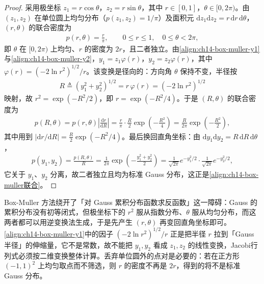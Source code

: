 \documentclass[../../main.tex]{subfiles}
\begin{document}
\begin{proof}
采用极坐标 $z_{1}=r\cos\theta$，$z_{2}=r\sin\theta$，其中 $r\in[0,1]$，$\theta\in[0,2\pi)$。由 $(z_{1},z_{2})$ 在单位圆上均匀分布（$p(z_{1},z_{2})=1/\pi$）及面积元 $\mathrm{d}z_{1}\mathrm{d}z_{2}=r\,\mathrm{d}r\,\mathrm{d}\theta$，$(r,\theta)$ 的联合密度为
\begin{align*}
p(r,\theta)=\frac{r}{\pi},\qquad 0\leqslant r\leqslant 1,\quad 0\leqslant\theta<2\pi,
\end{align*}
即 $\theta$ 在 $[0,2\pi)$ 上均匀、$r$ 的密度为 $2r$，且二者独立。由\eqref{align:ch14-box-muller-y1}与\eqref{align:ch14-box-muller-y2}，$y_{1}=z_{1}\varphi(r)$，$y_{2}=z_{2}\varphi(r)$，其中 $\varphi(r)=\left(-2\ln r^{2}\right)^{1/2}/r$。该变换是径向的：方向角 $\theta$ 保持不变，半径按
\begin{align*}
R\triangleq\left(y_{1}^{2}+y_{2}^{2}\right)^{1/2}=r\,\varphi(r)=\left(-2\ln r^{2}\right)^{1/2}
\end{align*}
映射，故 $r^{2}=\exp\left(-R^{2}/2\right)$，即 $r=\exp\left(-R^{2}/4\right)$。于是 $(R,\theta)$ 的联合密度为
\begin{align*}
p(R,\theta)=p(r,\theta)\left|\frac{\mathrm{d}r}{\mathrm{d}R}\right|=\frac{r}{\pi}\cdot\frac{R}{2}\exp\left(-\frac{R^{2}}{4}\right)=\frac{R}{2\pi}\exp\left(-\frac{R^{2}}{2}\right),
\end{align*}
其中用到 $\left|\mathrm{d}r/\mathrm{d}R\right|=\frac{R}{2}\exp\left(-R^{2}/4\right)$。最后换回直角坐标：由 $\mathrm{d}y_{1}\mathrm{d}y_{2}=R\,\mathrm{d}R\,\mathrm{d}\theta$，
\begin{align*}
p(y_{1},y_{2})=\frac{p(R,\theta)}{R}=\frac{1}{2\pi}\exp\left(-\frac{y_{1}^{2}+y_{2}^{2}}{2}\right)=\frac{1}{\sqrt{2\pi}}e^{-y_{1}^{2}/2}\cdot\frac{1}{\sqrt{2\pi}}e^{-y_{2}^{2}/2},
\end{align*}
它关于 $y_{1}$、$y_{2}$ 分离，故二者独立且均为标准 Gauss 分布，这正是\eqref{align:ch14-box-muller联合}。
\end{proof}

\begin{remark}Box-Muller 方法绕开了「对 Gauss 累积分布函数求反函数」这一障碍：Gauss 的累积分布没有初等闭式，但极坐标下的 $r^{2}$ 服从指数分布、$\theta$ 服从均匀分布，而这两者都可以用逆变换法生成，于是先产生 $(r,\theta)$ 再变回直角坐标即可。\eqref{align:ch14-box-muller-y1}中的因子 $\left(-2\ln r^{2}\right)^{1/2}/r$ 正是把半径 $r$ 拉到「Gauss 半径」的伸缩量，它不是常数，故不能把 $y_{1},y_{2}$ 看成 $z_{1},z_{2}$ 的线性变换，Jacobi行列式必须按二维变换整体计算。丢弃单位圆外的点对是必要的：若在正方形 $(-1,1)^{2}$ 上均匀取点而不筛选，则 $r$ 的密度不再是 $2r$，得到的将不是标准 Gauss 分布。
\end{remark}
\end{document}
